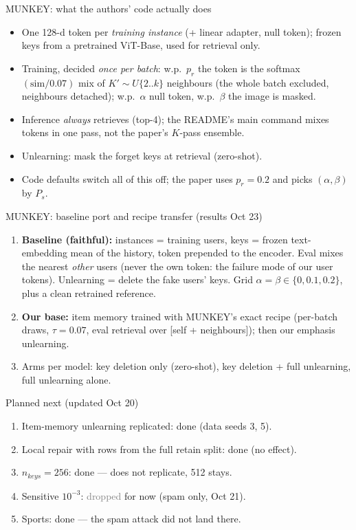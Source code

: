 \documentclass{beamer}
\newcommand{\stdone}{\textcolor{green!50!black}{done}}
\newcommand{\stdrop}{\textcolor{gray}{dropped}}
\begin{document}
\begin{frame}{MUNKEY: what the authors' code actually does}
\begin{itemize}
  \item One 128-d token per \emph{training instance} (+ linear adapter, null
        token); frozen keys from a pretrained ViT-Base, used for retrieval only.
  \item Training, decided \emph{once per batch}: w.p.\ $p_r$ the token is the
        softmax$(\mathrm{sim}/0.07)$ mix of $K' \sim U\{2..k\}$ neighbours (the
        whole batch excluded, neighbours detached); w.p.\ $\alpha$ null token,
        w.p.\ $\beta$ the image is masked.
  \item Inference \emph{always} retrieves (top-4); the README's main command
        mixes tokens in one pass, not the paper's $K$-pass ensemble.
  \item Unlearning: mask the forget keys at retrieval (zero-shot).
  \item Code defaults switch all of this off; the paper uses $p_r = 0.2$ and
        picks $(\alpha, \beta)$ by $P_s$.
\end{itemize}
\end{frame}

\begin{frame}{MUNKEY: baseline port and recipe transfer (results Oct 23)}
\begin{enumerate}
  \item \textbf{Baseline (faithful):} instances = training users, keys = frozen
        text-embedding mean of the history, token prepended to the encoder.
        Eval mixes the nearest \emph{other} users (never the own token: the
        failure mode of our user tokens). Unlearning = delete the fake users'
        keys. Grid $\alpha = \beta \in \{0, 0.1, 0.2\}$, plus a clean
        retrained reference.
  \item \textbf{Our base:} item memory trained with MUNKEY's exact recipe
        (per-batch draws, $\tau = 0.07$, eval retrieval over [self +
        neighbours]); then our emphasis unlearning.
  \item Arms per model: key deletion only (zero-shot), key deletion + full
        unlearning, full unlearning alone.
\end{enumerate}
\end{frame}

\begin{frame}{Planned next (updated Oct 20)}
\begin{enumerate}
  \item Item-memory unlearning replicated: \stdone{} (data seeds 3, 5).
  \item Local repair with rows from the full retain split: \stdone{} (no effect).
  \item $n_{keys}=256$: \stdone{} --- does not replicate, 512 stays.
  \item Sensitive $10^{-3}$: \stdrop{} for now (spam only, Oct 21).
  \item Sports: \stdone{} --- the spam attack did not land there.
\end{enumerate}
\end{frame}
\end{document}
